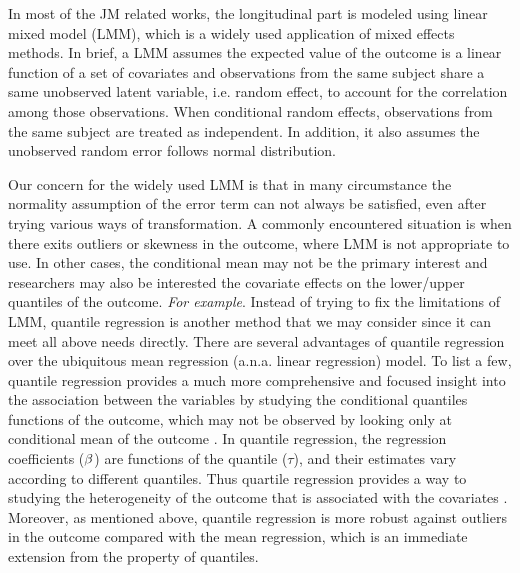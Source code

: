\documentclass{article}
\begin{document}
In most of the JM related works, the longitudinal part is modeled using linear mixed model (LMM), which is a widely used application of mixed effects methods. In brief, a LMM assumes the expected value of the outcome is a linear function of a set of covariates and observations from the same subject share a same unobserved latent variable, i.e. random effect, to account for the correlation among those observations. When conditional random effects, observations from the same subject are treated as independent. In addition, it also assumes the unobserved random error follows normal distribution.\par

Our concern for the widely used LMM is that in many circumstance the normality assumption of the error term can not always be satisfied, even after trying various ways of transformation. A commonly encountered situation is when there exits outliers or skewness in the outcome, where LMM is not appropriate to use. In other cases, the conditional mean may not be the primary interest and researchers may also be interested the covariate effects on the lower/upper quantiles of the outcome. \emph{For example}. Instead of trying to fix the limitations of LMM, quantile regression is another method that we may consider since it can meet all above needs directly. There are several advantages of quantile regression over the ubiquitous mean regression (a.n.a. linear regression) model. To list a few, quantile regression provides a much more comprehensive and focused insight into the association between the variables by studying the conditional quantiles functions of the outcome,  which may not be observed by looking only at conditional mean of the outcome \citep{koenker2005quantile}. In quantile regression, the regression coefficients (${\bf \beta}$) are functions of the quantile ($\tau$), and their estimates vary according to different quantiles. Thus quartile regression provides a way to studying the heterogeneity of the outcome that is associated with the covariates \citep{koenker2005quantile}. Moreover, as mentioned above, quantile regression is more robust against outliers in the outcome compared with the mean regression, which is an immediate extension from the property of quantiles. \par
\end{document}
